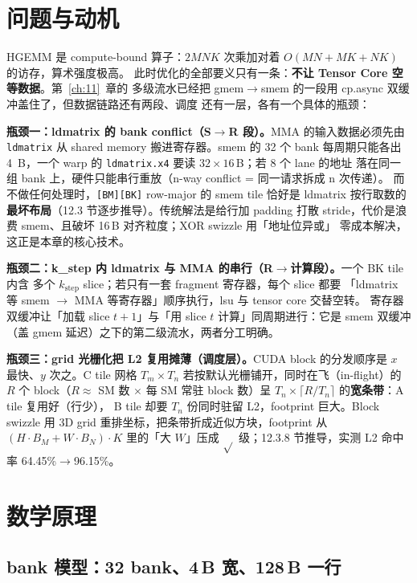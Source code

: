 \section{问题与动机}

HGEMM 是 compute-bound 算子：$2MNK$ 次乘加对着 $O(MN+MK+NK)$ 的访存，算术强度极高。
此时优化的全部要义只有一条：\textbf{不让 Tensor Core 空等数据}。第~\ref{ch:11}~章的
多级流水已经把 gmem$\to$smem 的一段用 cp.async 双缓冲盖住了，但数据链路还有两段、调度
还有一层，各有一个具体的瓶颈：

\textbf{瓶颈一：ldmatrix 的 bank conflict（S$\to$R 段）。}\allowbreak{}MMA 的输入数据必须先由
\texttt{ldmatrix} 从 shared memory 搬进寄存器。smem 的 32 个 bank 每周期只能各出
4~B，一个 warp 的 \texttt{ldmatrix.x4} 要读 $32\times16$\,B；若 8 个 lane 的地址
落在同一组 bank 上，硬件只能串行重放（n-way conflict = 同一请求拆成 n 次传递）。
而不做任何处理时，\texttt{[BM][BK]} row-major 的 smem tile 恰好是 ldmatrix
按行取数的\textbf{最坏布局}（12.3 节逐步推导）。传统解法是给行加 padding 打散
stride，代价是浪费 smem、且破坏 16\,B 对齐粒度；XOR swizzle 用「地址位异或」
零成本解决，这正是本章的核心技术。

\textbf{瓶颈二：k\_step 内 ldmatrix 与 MMA 的串行（R$\to$计算段）。}一个 BK tile 内含
多个 $k_{\mathrm{step}}$ slice；若只有一套 fragment 寄存器，每个 slice 都要
「ldmatrix 等 smem $\to$ MMA 等寄存器」顺序执行，lsu 与 tensor core 交替空转。
寄存器双缓冲让「加载 slice $t{+}1$」与「用 slice $t$ 计算」同周期进行：它是
smem 双缓冲（盖 gmem 延迟）之下的第二级流水，两者分工明确。

\textbf{瓶颈三：grid 光栅化把 L2 复用摊薄（调度层）。}\allowbreak{}CUDA block 的分发顺序是
$x$ 最快、$y$ 次之。C tile 网格 $T_m\times T_n$ 若按默认光栅铺开，同时在飞（in-flight）的
$R$ 个 block（$R\approx$ SM 数 $\times$ 每 SM 常驻 block 数）呈
$T_n\times\lceil R/T_n\rceil$ 的\textbf{宽条带}：A tile 复用好（行少），
B tile 却要 $T_n$ 份同时驻留 L2，footprint 巨大。Block swizzle 用 3D grid
重排坐标，把条带折成近似方块，footprint 从 $(H\!\cdot\!B_M+W\!\cdot\!B_N)\cdot K$
里的「大 $W$」压成 $\sqrt{}$ 级；12.3.8 节推导，实测 L2 命中率 64.45\%$\to$96.15\%。

\section{数学原理}

\subsection{bank 模型：32 bank、4\,B 宽、128\,B 一行}

